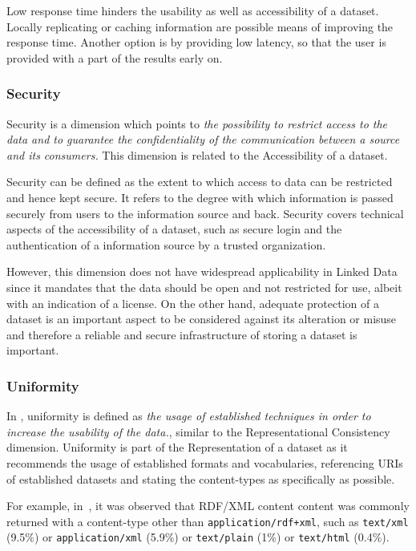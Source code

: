 Low response time hinders the usability as well as accessibility of a dataset.
Locally replicating or caching information are possible means of improving the response time.
Another option is by providing low latency, so that the user is provided with a part of the results early on.

\subsubsection{Security}
Security is a dimension which points to \emph{the possibility to restrict access to the data and to guarantee the confidentiality of the communication between a source and its consumers.} 
This dimension is related to the Accessibility of a dataset.

\begin{definition}[Security]
Security can be defined as the extent to which access to data can be restricted and hence kept secure.
It refers to the degree with which information is passed securely from users to the information source and back. 
Security covers technical aspects of the accessibility of a dataset, such as secure login and the authentication of a information source by a trusted organization.
\end{definition}

However, this dimension does not have widespread applicability in Linked Data since it mandates that the data should be open and not restricted for use, albeit with an indication of a license. 
On the other hand, adequate protection of a dataset is an important aspect to be considered against its alteration or misuse and therefore a reliable and secure infrastructure of storing a dataset is important.

\subsubsection{Uniformity}
In \cite{Flemming}, uniformity is defined as \emph{the usage of established techniques in order to increase the usability of the data.}, similar to the Representational Consistency dimension.
Uniformity is part of the Representation of a dataset as it recommends the usage of established formats and vocabularies, referencing URIs of established datasets and stating the content-types as specifically as possible.

For example, in~\cite{Hogan}, it was observed that RDF/XML content content was commonly returned with a content-type other than \texttt{application/rdf+xml}, such as \texttt{text/xml} (9.5\%) or \texttt{application/xml} (5.9\%) or \texttt{text/plain} (1\%) or \texttt{text/html} (0.4\%).

